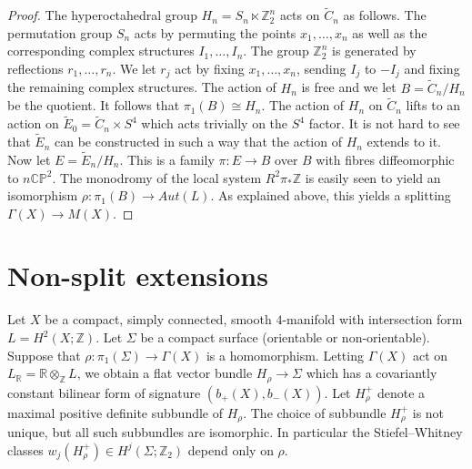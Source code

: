 \documentclass{amsart}
\theoremstyle{definition}
\theoremstyle{remark}
\numberwithin{equation}{section}
\begin{document}
\begin{proof}
The hyperoctahedral group $H_n = S_n \ltimes \mathbb{Z}_2^n$ acts on $\widetilde{C}_n$ as follows. The permutation group $S_n$ acts by permuting the points $x_1, \dots , x_n$ as well as the corresponding complex structures $I_1, \dots , I_n$. The group $\mathbb{Z}_2^n$ is generated by reflections $r_1, \dots , r_n$. We let $r_j$ act by fixing $x_1, \dots , x_n$, sending $I_j$ to $-I_j$ and fixing the remaining complex structures. The action of $H_n$ is free and we let $B = \widetilde{C}_n/H_n$ be the quotient. It follows that $\pi_1(B) \cong H_n$. The action of $H_n$ on $\widetilde{C}_n$ lifts to an action on $\widetilde{E}_0 = \widetilde{C}_n \times S^4$ which acts trivially on the $S^4$ factor. It is not hard to see that $\widetilde{E}_n$ can be constructed in such a way that the action of $H_n$ extends to it. Now let $E = \widetilde{E}_n/ H_n$. This is a family $\pi : E \to B$ over $B$ with fibres diffeomorphic to $n \mathbb{CP}^2$. The monodromy of the local system $R^2 \pi_* \mathbb{Z}$ is easily seen to yield an isomorphism $\rho : \pi_1(B) \to Aut(L)$. As explained above, this yields a splitting $\Gamma(X) \to M(X)$.
\end{proof}


\section{Non-split extensions}\label{sec:nsplit}

Let $X$ be a compact, simply connected, smooth $4$-manifold with intersection form $L = H^2(X ; \mathbb{Z})$. Let $\Sigma$ be a compact surface (orientable or non-orientable). Suppose that $\rho : \pi_1(\Sigma) \to \Gamma(X)$ is a homomorphism. Letting $\Gamma(X)$ act on $L_{\mathbb{R}} = \mathbb{R} \otimes_{\mathbb{Z}} L$, we obtain a flat vector bundle $H_{\rho} \to \Sigma$ which has a covariantly constant bilinear form of signature $(b_+(X) , b_-(X))$. Let $H^+_{\rho}$ denote a maximal positive definite subbundle of $H_{\rho}$. The choice of subbundle $H^+_{\rho}$ is not unique, but all such subbundles are isomorphic. In particular the Stiefel--Whitney classes $w_{j}( H^+_{\rho}) \in H^j( \Sigma ; \mathbb{Z}_2)$ depend only on $\rho$.
\end{document}
